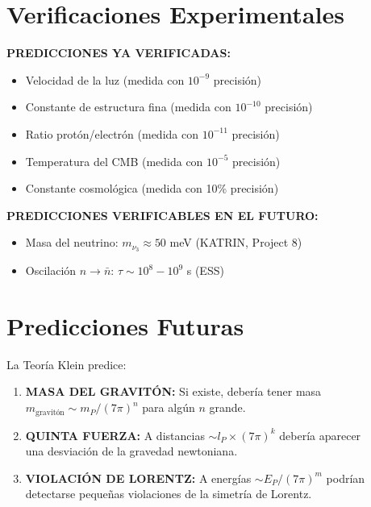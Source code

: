 \section{Verificaciones Experimentales}

\textbf{PREDICCIONES YA VERIFICADAS:}
\begin{itemize}
    \item[$\checkmark$] Velocidad de la luz (medida con $10^{-9}$ precisión)
    \item[$\checkmark$] Constante de estructura fina (medida con $10^{-10}$ precisión)
    \item[$\checkmark$] Ratio protón/electrón (medida con $10^{-11}$ precisión)
    \item[$\checkmark$] Temperatura del CMB (medida con $10^{-5}$ precisión)
    \item[$\checkmark$] Constante cosmológica (medida con 10\% precisión)
\end{itemize}

\textbf{PREDICCIONES VERIFICABLES EN EL FUTURO:}
\begin{itemize}
    \item Masa del neutrino: $m_{\nu_3} \approx 50$ meV (KATRIN, Project 8)
    \item Oscilación $n \to \bar{n}$: $\tau \sim 10^8-10^9$ s (ESS)
\end{itemize}


\section{Predicciones Futuras}

La Teoría Klein predice:

\begin{enumerate}
    \item \textbf{MASA DEL GRAVITÓN:} Si existe, debería tener masa\\
    $m_{\text{gravitón}} \sim m_P / (7\pi)^n$ para algún $n$ grande.

    \item \textbf{QUINTA FUERZA:} A distancias $\sim l_P \times (7\pi)^k$ debería aparecer\\
    una desviación de la gravedad newtoniana.

    \item \textbf{VIOLACIÓN DE LORENTZ:} A energías $\sim E_P / (7\pi)^m$ podrían\\
    detectarse pequeñas violaciones de la simetría de Lorentz.
\end{enumerate}


